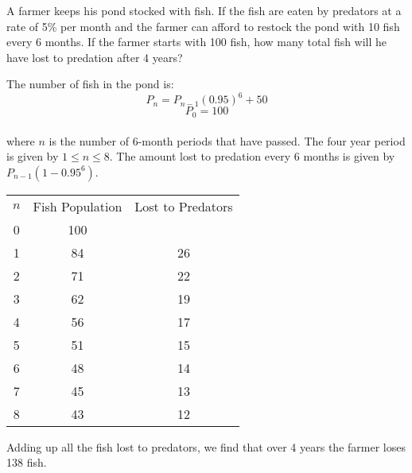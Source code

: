 \begin{Exercise}[label=seqcalc6]
A farmer keeps his pond stocked with fish. If the fish are eaten by predators 
at a rate of 5\% per month and the farmer can afford to restock the pond with 
10 fish every 6 months. If the farmer starts with 100 fish, how many total fish 
will he have lost to predation after 4 years?
\end{Exercise}

\begin{Answer}[ref=seqcalc6]
The number of fish in the pond is:
$$P_n = P_{n-1}(0.95)^6 + 50$$
$$P_0 = 100$$\\
where $n$ is the number of 6-month periods that have passed. The four year 
period is given by $1 \leq n \leq 8$. The amount lost to predation every 6 
months is given by $P_{n-1}(1-0.95^6)$.
\begin{center}
\begin{tabular}{|c|c|c|}\hline
$n$ & Fish Population & Lost to Predators\\
0 & 100 & \\
\hline
1 & 84 & 26\\
\hline
2 & 71 & 22\\
\hline
3 & 62 & 19\\
\hline
4 & 56 & 17\\
\hline
5 & 51 & 15\\
\hline
6 & 48 & 14\\
\hline
7 & 45 & 13\\
\hline
8 & 43 & 12\\
\hline

\end{tabular}
\end{center}
Adding up all the fish lost to predators, we find that over 4 years the farmer loses 138 fish. 
\end{Answer}






